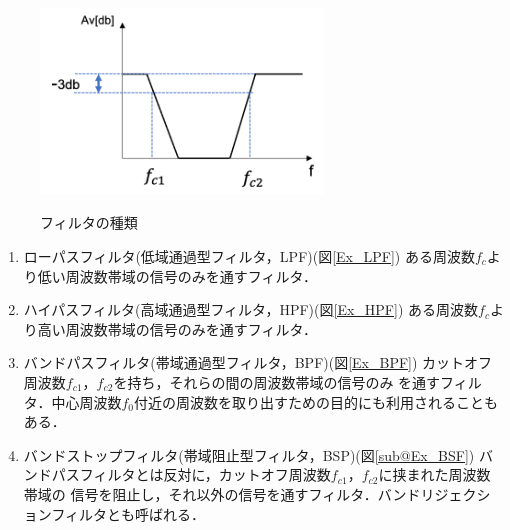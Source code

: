 \documentclass[a4paper,11pt]{jsarticle}
\begin{document}
\begin{figure}[H]
\begin{minipage}{0.48\textwidth}
\begin{center}
    \end{center}
    \label{Ex_BPF}
  \end{minipage}
  \begin{minipage}{0.48\textwidth}
    \begin{center}
      \includegraphics[clip,width=7.5cm]{picture/E_BSF.png}
    \end{center}
    \label{Ex_BSF}
  \end{minipage}
  \caption{フィルタの種類}
  \label{Ex_filtar}
\end{figure}
\begin{enumerate}
  \item ローパスフィルタ(低域通過型フィルタ，LPF)(図\ref{Ex_LPF})
        ある周波数$f_c$より低い周波数帯域の信号のみを通すフィルタ．
  \item ハイパスフィルタ(高域通過型フィルタ，HPF)(図\ref{Ex_HPF})
        ある周波数$f_c$より高い周波数帯域の信号のみを通すフィルタ．
  \item バンドパスフィルタ(帯域通過型フィルタ，BPF)(図\ref{Ex_BPF})
        カットオフ周波数$f_{c1}，f_{c2}$を持ち，それらの間の周波数帯域の信号のみ
        を通すフィルタ．中心周波数$f_0$付近の周波数を取り出すための目的にも利用されることもある．
  \item バンドストップフィルタ(帯域阻止型フィルタ，BSP)(図\ref{sub@Ex_BSF})
        バンドパスフィルタとは反対に，カットオフ周波数$f_{c1}，f_{c2}$に挟まれた周波数帯域の
        信号を阻止し，それ以外の信号を通すフィルタ．バンドリジェクションフィルタとも呼ばれる．
\end{enumerate}
\end{document}
